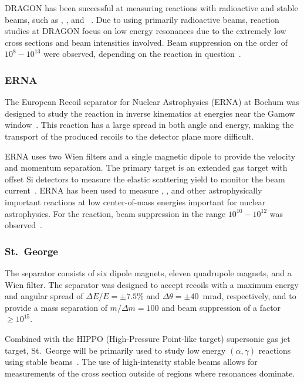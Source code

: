 DRAGON has been successful at measuring reactions with radioactive and
stable beams, such as
,
, and
~\cite{Engel2005}.
Due to using primarily radioactive beams, reaction studies at DRAGON
focus on low energy resonances due to the extremely low cross sections
and beam intensities involved. Beam suppression on the order of $10^{8}
- 10^{13}$ were observed, depending on the reaction in
question~\cite{Engel2005}.

\subsubsection{ERNA}
The European Recoil separator for Nuclear Astrophysics (ERNA) at Bochum
was designed to study the
 reaction in inverse
kinematics at energies near the Gamow window~\cite{Rogalla2003}. This
reaction has a large spread in both angle and energy, making the
transport of the produced recoils to the detector plane more difficult.

ERNA uses two Wien filters and a single magnetic dipole to provide the
velocity and momentum separation. The primary target is an extended gas
target with offset Si detectors to measure the elastic scattering yield
to monitor the beam current~\cite{DiLeva2008}. ERNA has been used to
measure ,
, and other
astrophysically important reactions at low center-of-mass energies
important for nuclear astrophysics. For the
 reaction, beam
suppression in the range $10^{10} - 10^{12}$ was
observed~\cite{DiLeva2008}.

\subsubsection{St.\ George}
The separator consists of six dipole magnets, eleven quadrupole magnets,
and a Wien filter. The separator was designed to accept recoils with a
maximum energy and angular spread of $\Delta E/E = \pm7.5\%$ and
$\Delta\theta = \pm40$~mrad, respectively, and to provide a mass
separation of $m/\Delta m = 100$ and beam suppression of a factor $\geq
10^{15}$.

Combined with the HIPPO (High-Pressure Point-like target) supersonic gas
jet target, St.\ George will be primarily used to study low energy
$(\alpha,\gamma)$ reactions using stable beams~\cite{Kontos2012}. The
use of high-intensity stable beams allows for measurements of the cross
section outside of regions where resonances dominate.

